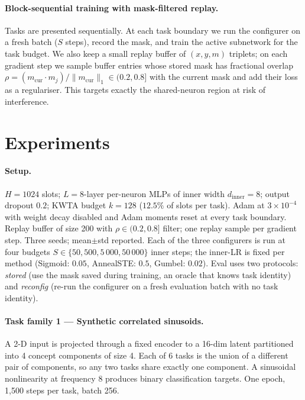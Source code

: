 \documentclass{article}
\theoremstyle{plain}
\theoremstyle{remark}
\begin{document}
\paragraph{Block-sequential training with mask-filtered replay.}
Tasks are presented sequentially. At each task boundary we run the
configurer on a fresh batch ($S$ steps), record the mask, and train
the active subnetwork for the task budget. We also keep a small replay
buffer of $(x,y,m)$ triplets; on each gradient step we sample buffer
entries whose stored mask has fractional overlap
$\rho=(m_\mathrm{cur}\cdot m_j)/\|m_\mathrm{cur}\|_1\in(0.2,0.8]$ with
the current mask and add their loss as a regulariser. This targets
exactly the shared-neuron region at risk of interference.

\section{Experiments}
\label{sec:experiments}

\paragraph{Setup.}
$H{=}1024$ slots; $L{=}8$-layer per-neuron MLPs of inner width
$d_\mathrm{inner}{=}8$; output dropout $0.2$; KWTA budget $k{=}128$
($12.5\%$ of slots per task). Adam at $3\times 10^{-4}$ with weight
decay disabled and Adam moments reset at every task boundary. Replay
buffer of size 200 with $\rho\in(0.2, 0.8]$ filter; one replay sample
per gradient step. Three seeds; mean$\pm$std reported. Each of the
three configurers is run at four budgets $S\in\{50,500,5\,000,50\,000\}$
inner steps; the inner-LR is fixed per method
(Sigmoid: $0.05$, AnnealSTE: $0.5$, Gumbel: $0.02$). Eval uses two
protocols:
\emph{stored} (use the mask saved during training, an oracle that
knows task identity) and \emph{reconfig} (re-run the configurer on a
fresh evaluation batch with no task identity).

\paragraph{Task family 1 — Synthetic correlated sinusoids.}
A 2-D input is projected through a fixed encoder to a 16-dim latent
partitioned into 4 concept components of size 4. Each of 6 tasks is
the union of a different pair of components, so any two tasks share
exactly one component. A sinusoidal nonlinearity at frequency 8
produces binary classification targets. One epoch, 1{,}500 steps per
task, batch 256.
\end{document}
